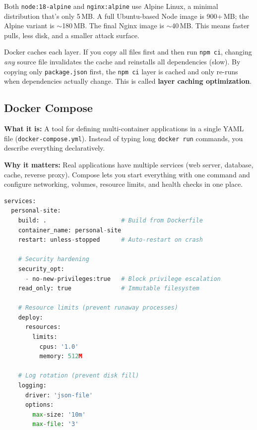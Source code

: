 \documentclass[11pt, letterpaper]{article}
\begin{document}
\begin{infobox}
Both \texttt{node:18-alpine} and \texttt{nginx:alpine} use Alpine Linux, a
minimal distribution that's only 5\,MB. A full Ubuntu-based Node image is
900+\,MB; the Alpine variant is $\sim$180\,MB. The final Nginx image is
$\sim$40\,MB. This means faster pulls, less disk, and a smaller attack surface.
\end{infobox}

\begin{infobox}
Docker caches each layer. If you copy all files first and then run
\texttt{npm ci}, changing \textit{any} source file invalidates the cache and
reinstalls all dependencies (slow). By copying only \texttt{package.json}
first, the \texttt{npm ci} layer is cached and only re-runs when dependencies
actually change. This is called \textbf{layer caching optimization}.
\end{infobox}

\subsection{Docker Compose}

\textbf{What it is:} A tool for defining multi-container applications in a
single YAML file (\texttt{docker-compose.yml}). Instead of typing long
\texttt{docker run} commands, you describe everything declaratively.

\textbf{Why it matters:} Real applications have multiple services (web server,
database, cache, reverse proxy). Compose lets you start everything with one
command and configure networking, volumes, resource limits, and health checks
in one place.

\begin{lstlisting}[style=code, language=Python, caption={docker-compose.yml --- annotated (simplified)}]
services:
  personal-site:
    build: .                     # Build from Dockerfile
    container_name: personal-site
    restart: unless-stopped      # Auto-restart on crash

    # Security hardening
    security_opt:
      - no-new-privileges:true   # Block privilege escalation
    read_only: true              # Immutable filesystem

    # Resource limits (prevent runaway processes)
    deploy:
      resources:
        limits:
          cpus: '1.0'
          memory: 512M

    # Log rotation (prevent disk fill)
    logging:
      driver: 'json-file'
      options:
        max-size: '10m'
        max-file: '3'
\end{lstlisting}
\end{document}
